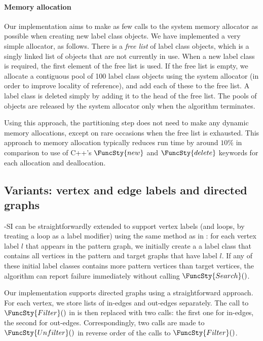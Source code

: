 \paragraph{Memory allocation}
Our implementation aims to make as few calls to the system memory allocator as possible when creating
new label class objects.  We have implemented a very simple allocator, as follows.  There is a \emph{free list}
of label class objects, which is a singly linked list of objects that are not currently in use.  When
a new label class is required, the first element of the free list is used.  If the free list is empty,
we allocate a contiguous pool of 100 label class objects using the system allocator (in order to improve
locality of reference), and add each of these to the free list.  A label class is deleted simply by
adding it to the head of the free list.  The pools of objects are released by the system allocator only when
the algorithm terminates.

Using this approach, the partitioning step does not need to make any dynamic memory allocations, except
on rare occasions when the free list is exhausted.
This approach to memory allocation typically reduces run time by around $10\%$ in comparison to use of
C++'s $\FuncSty{new}$ and $\FuncSty{delete}$ keywords for each allocation and deallocation.

\subsection{Variants: vertex and edge labels and directed graphs}

\McSplit-SI can be straightforwardly extended to support vertex labels (and loops, by
treating a loop as a label modifier) using
the same method as in \McSplit: for each vertex label $l$ that appears in the pattern graph,
we initially create a a label class that contains all vertices in the pattern and target
graphs that have label $l$.  If any of these initial label classes contains more pattern vertices
than target vertices, the algorithm can report failure immediately without calling
$\FuncSty{Search}()$.

Our implementation supports directed graphs using a straightforward approach.  For each
vertex, we store lists of in-edges and out-edges separately.  The call to $\FuncSty{Filter}()$
in  is then replaced with two calls: the first one for in-edges, the second
for out-edges.  Correspondingly, two calls are made to $\FuncSty{Unfilter}()$ in reverse
order of the calls to $\FuncSty{Filter}()$.

